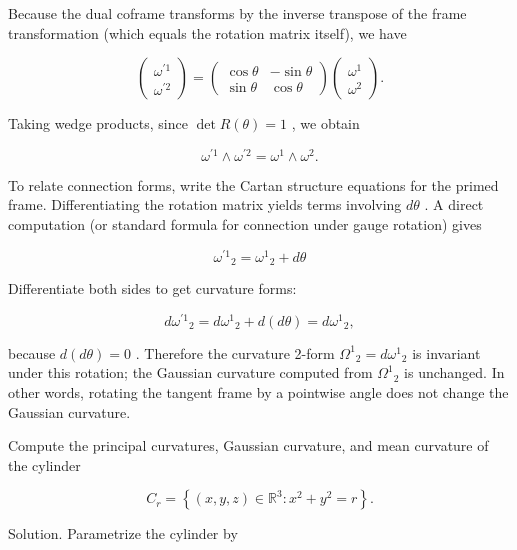 \documentclass[10pt]{article}
\begin{document}
Because the dual coframe transforms by the inverse transpose of the frame transformation (which equals the rotation matrix itself), we have

\[
\left( \begin{array}{l} {\omega }^{\prime 1} \\  {\omega }^{\prime 2} \end{array}\right)  = \left( \begin{matrix} \cos \theta &  - \sin \theta \\  \sin \theta & \cos \theta  \end{matrix}\right) \left( \begin{array}{l} {\omega }^{1} \\  {\omega }^{2} \end{array}\right) .
\]

Taking wedge products, since \(\det R\left( \theta \right)  = 1\) , we obtain

\[
{\omega }^{\prime 1} \land  {\omega }^{\prime 2} = {\omega }^{1} \land  {\omega }^{2}.
\]

To relate connection forms, write the Cartan structure equations for the primed frame. Differentiating the rotation matrix yields terms involving \({d\theta }\) . A direct computation (or standard formula for connection under gauge rotation) gives

\[
{\omega }^{\prime 1}{}_{2} = {\omega }^{1}{}_{2} + {d\theta }
\]

Differentiate both sides to get curvature forms:

\[
d{\omega }^{\prime 1}{}_{2} = d{\omega }^{1}{}_{2} + d\left( {d\theta }\right)  = d{\omega }^{1}{}_{2},
\]

because \(d\left( {d\theta }\right)  = 0\) . Therefore the curvature 2-form \({\Omega }^{1}{}_{2} = d{\omega }^{1}{}_{2}\) is invariant under this rotation; the Gaussian curvature computed from \({\Omega }^{1}{}_{2}\) is unchanged. In other words, rotating the tangent frame by a pointwise angle does not change the Gaussian curvature.

\begin{problem}[title=PROBLEM 3 (5 POINTS)]
Compute the principal curvatures, Gaussian curvature, and mean curvature of the cylinder

\[
{C}_{r} = \left\{  {\left( {x,y,z}\right)  \in  {\mathbb{R}}^{3} : {x}^{2} + {y}^{2} = r}\right\}  .
\]
\end{problem}

Solution. Parametrize the cylinder by
\end{document}
